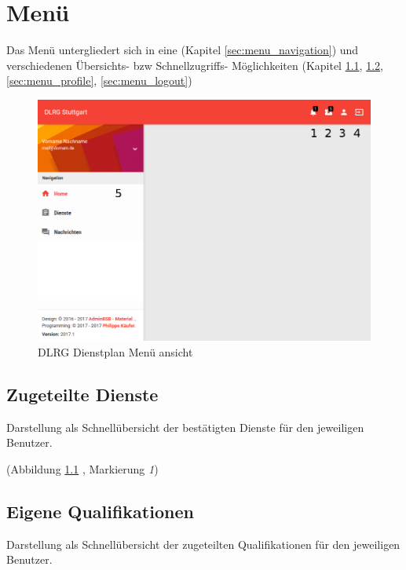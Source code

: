\chapter{Menü}
\label{cha:menu}

Das Menü untergliedert sich in eine  (Kapitel \ref{sec:menu_navigation}) und verschiedenen Übersichts- bzw Schnellzugriffs- Möglichkeiten (Kapitel \ref{sec:menu_approvedservice}, \ref{sec:menu_qualification}, \ref*{sec:menu_profile}, \ref{sec:menu_logout})

\begin{figure}[h]
 \begin{addmargin}{-0.2\linewidth}
   \centering 
   \includegraphics[width=14cm]{Bilder/view_menu.png}
 \end{addmargin} 
 \caption[Menü ansicht]{DLRG Dienstplan Menü ansicht}
 \label{fig:view_menu}
\end{figure}

\section{Zugeteilte Dienste}
\label{sec:menu_approvedservice}
Darstellung als Schnellübersicht der bestätigten Dienste für den jeweiligen Benutzer.

\noindent (Abbildung \ref{fig:view_menu} \textit{}, Markierung \textit{1})

\section{Eigene Qualifikationen}
\label{sec:menu_qualification}
Darstellung als Schnellübersicht der zugeteilten Qualifikationen für den jeweiligen Benutzer.

